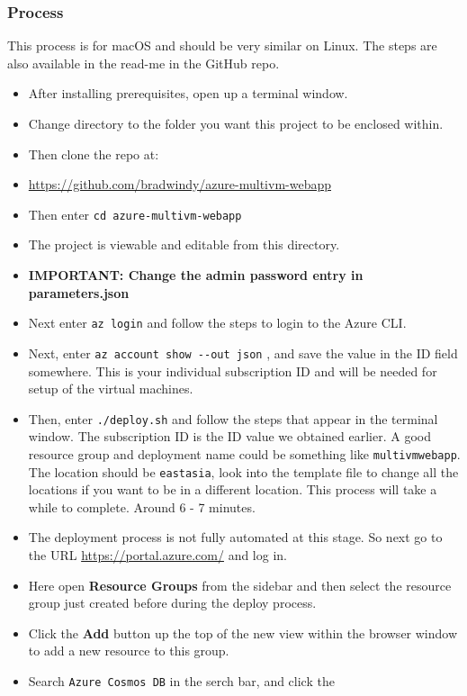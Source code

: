 \documentclass[12pt]{extarticle}
\begin{document}
\subsubsection*{Process}
This process is for macOS and should be very similar on Linux. The steps are also available in the read-me in the GitHub repo.
\begin{itemize}
\item
  After installing prerequisites, open up a terminal window.
\item
  Change directory to the folder you want this project to be enclosed
  within.
\item
  Then clone the repo at:
\item \url{https://github.com/bradwindy/azure-multivm-webapp}
\item
  Then enter \texttt{cd\ azure-multivm-webapp}
\item
  The project is viewable and editable from this directory.
\item
  \textbf{IMPORTANT: Change the admin password entry in parameters.json}
\item
  Next enter \texttt{az\ login} and follow the steps to login to the
  Azure CLI.
\item
  Next, enter \texttt{az\ account\ show\ -\/-out\ json} , and save the
  value in the ID field somewhere. This is your individual subscription
  ID and will be needed for setup of the virtual machines.
\item
  Then, enter \texttt{./deploy.sh} and follow the steps that appear in
  the terminal window. The subscription ID is the ID value we obtained
  earlier. A good resource group and deployment name could be something
  like \texttt{multivmwebapp}. The location should be \texttt{eastasia},
  look into the template file to change all the locations if you want to
  be in a different location. This process will take a while to
  complete. Around 6 - 7 minutes.
\item
  The deployment process is not fully automated at this stage. So next
  go to the URL \url{https://portal.azure.com/} and log in.
\item
  Here open \textbf{Resource Groups} from the sidebar and then select
  the resource group just created before during the deploy process.
\item
  Click the \textbf{Add} button up the top of the new view within the
  browser window to add a new resource to this group.
\item
  Search \texttt{Azure\ Cosmos\ DB} in the serch bar, and click the

\end{itemize}
\end{document}
